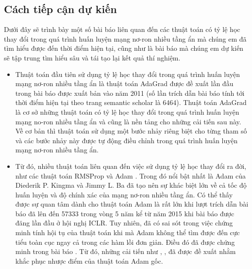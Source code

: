 \documentclass{article}[14pt]
\begin{document}
{    \subsection{Cách tiếp cận dự kiến}
    
    
    
    Dưới đây sẽ trình bày một số bài báo liên quan đến các thuật toán có tỷ lệ học thay đổi trong quá trình huấn luyện mạng nơ-ron nhiều tầng ẩn mà chúng em đã tìm hiểu được đến thời điểm hiện tại, cũng như là bài báo mà chúng em dự kiến sẽ tập trung tìm hiểu sâu và tái tạo lại kết quả thí nghiệm.
    \begin{itemize}
        \item Thuật toán đầu tiên sử dụng tỷ lệ học thay đổi trong quá trình huấn luyện mạng nơ-ron nhiều tầng ẩn là thuật toán AdaGrad được đề xuất lần đầu trong bài báo \cite{Duchi2011AdaptiveSM} được xuất bản vào năm 2011 (số lần trích dẫn bài báo tính tới thời điểm hiện tại theo trang semantic scholar là 6464). Thuật toán AdaGrad là cơ sở những thuật toán có tỷ lệ học thay đổi trong quá trình huấn luyện mạng no-ron nhiều tầng ẩn và cũng là nền tảng cho những cải tiến sau này. Về cơ bản thì thuật toán sử dụng một bước nhảy riêng biệt cho từng tham số và các bước nhảy này được tự động điều chỉnh trong quá trình huấn luyện mạng nơ-ron nhiều tầng ẩn.
        \item Từ đó, nhiều thuật toán liên quan đến việc sử dụng tỷ lệ học thay đổi ra đời, như các thuật toán RMSProp \cite{Tieleman2012RMSProp} và Adam \cite{Kingma2015AdamAM}. Trong đó nổi bật nhất là Adam của Diederik P. Kingma và Jimmy L. Ba đã tạo nên sự khác biệt lớn về cả tốc độ huấn luyện và độ chính xác của mạng nơ-ron nhiều tầng ẩn. Có thể thấy được sự quan tâm dành cho thuật toán Adam là rất lớn khi lượt trích dẫn bài báo đã lên đến 57333 trong vòng 5 năm kể từ năm 2015 khi bài báo được đăng lần đầu ở hội nghị ICLR. Tuy nhiên, đã có sai sót trong việc chứng minh tính hội tụ của thuật toán khi mà Adam không thể tìm được đến cực tiểu toàn cục ngay cả trong các hàm lồi đơn giản. Điều đó đã được chứng minh trong bài báo \cite{Reddi2018OnTC}. Từ đó, những cải tiến như \cite{Reddi2018OnTC}, \cite{Dozat2016IncorporatingNM}, \cite{Zhang2017NormalizedDA} đã được đề xuất nhằm khắc phục nhược điểm của thuật toán Adam gốc.

\end{itemize}}
\end{document}
